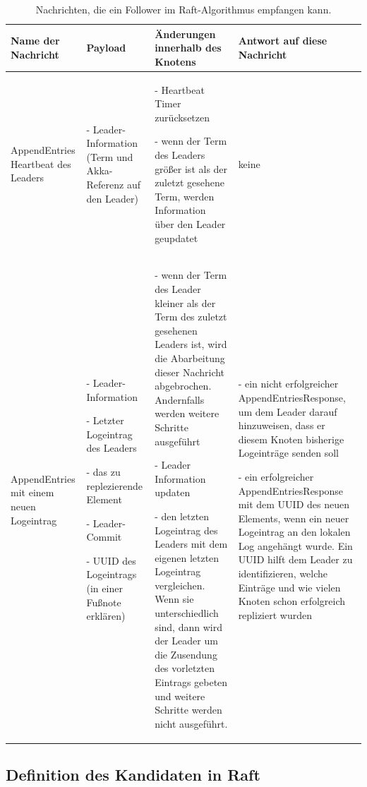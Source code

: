 \begin{table} \centering
	\begin{tabular}{|p{2.5cm}|p{3.5cm}|p{3.9cm}|p{3.55cm}|} 
		\hline
		\textbf{Name der Nachricht} & \textbf{Payload} & \textbf{Änderungen innerhalb des Knotens} & \textbf{Antwort auf diese Nachricht}\\
		
		\hline
		AppendEntries Heartbeat des Leaders & 
		- Leader-Information (Term und Akka-Referenz auf den Leader) & 
		- Heartbeat Timer zurücksetzen
		
		- wenn der Term des Leaders größer ist als der zuletzt gesehene Term, werden Information über den Leader geupdatet & keine\\
		
		\hline
		AppendEntries mit einem neuen Logeintrag & - Leader-Information
		
		- Letzter Logeintrag des Leaders
		
		- das zu replezierende Element
		
		- Leader-Commit
		
		- UUID des Logeintrags (in einer Fußnote erklären) 
		& - wenn der Term des Leader kleiner als der Term des zuletzt gesehenen Leaders ist, wird die Abarbeitung dieser Nachricht abgebrochen. Andernfalls werden weitere Schritte ausgeführt
		
		- Leader Information updaten
		
		- den letzten Logeintrag des Leaders mit dem eigenen letzten Logeintrag vergleichen. Wenn sie unterschiedlich sind, dann wird der Leader um die Zusendung des vorletzten Eintrags gebeten und weitere Schritte werden nicht ausgeführt.
		
		 & - ein nicht erfolgreicher AppendEntriesResponse, um dem Leader darauf hinzuweisen, dass er diesem Knoten bisherige Logeinträge senden soll
		 
		 - ein erfolgreicher AppendEntriesResponse mit dem UUID des neuen Elements, wenn ein neuer Logeintrag an den lokalen Log angehängt wurde. Ein UUID hilft dem Leader zu identifizieren, welche Einträge und wie vielen Knoten schon erfolgreich repliziert wurden\\
		
		\hline
	\end{tabular}
	\caption{Nachrichten, die ein Follower im Raft-Algorithmus empfangen kann.}
	\label{tab:followerReceive}
\end{table}

\subsection{Definition des Kandidaten in Raft}

